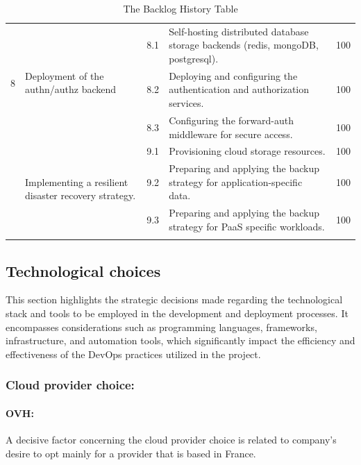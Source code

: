 \begin{longtable}[H]{|m{1cm}|m{3.25cm}|m{1cm}|m{7cm}|m{1.2cm}|}
\multirow{3}{1cm}{8} & \multirow{3}{3.25cm}{\raggedright Deployment of the authn/authz backend} 	& 8.1 & \raggedright Self-hosting distributed database storage backends (redis, mongoDB, postgresql).	 & 100\\
\cline{3-5}
&   & 8.2 &	\raggedright Deploying and configuring the authentication and authorization services.	 & 100\\
\cline{3-5}
&   & 8.3 &	\raggedright Configuring the forward-auth middleware for secure access.	 & 100\\
   \hline
   \pagebreak
   \hline
\multirow{3}{1cm}{9} & \multirow{3}{3.25cm}{\raggedright Implementing a resilient disaster recovery strategy.} & 9.1 &\raggedright  Provisioning cloud storage resources.		 & 100\\
\cline{3-5}
&   & 9.2 & \raggedright Preparing and applying the backup strategy for application-specific data.	 & 100\\
\cline{3-5}
&   & 9.3 &	\raggedright Preparing and applying the backup strategy for PaaS specific workloads.	 & 100\\
 \hline
\caption{ The Backlog History Table }
\end{longtable}

\subsection{Technological choices }
\hspace{7mm}This section highlights the strategic decisions made regarding the technological stack and tools to be employed in the development and deployment processes. It encompasses considerations such as programming languages, frameworks, infrastructure, and automation tools, which significantly impact the efficiency and effectiveness of the DevOps practices utilized in the project.
\subsubsection{Cloud provider choice: } 
\paragraph{OVH\cite{OVHcloud}: }

A decisive factor concerning the cloud provider choice is related to company’s desire to opt mainly for a provider that is based in France.  

